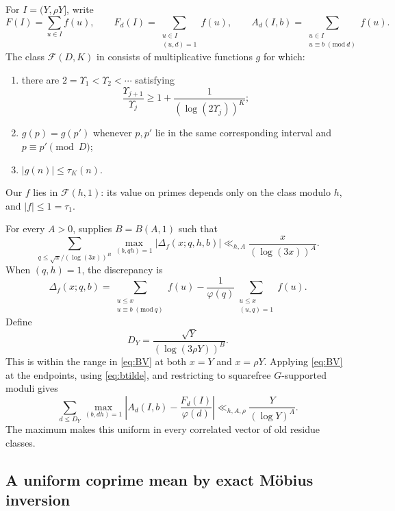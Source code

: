 \documentclass[10pt]{amsart}
\numberwithin{equation}{section}
\theoremstyle{remark}
\begin{document}
For \(I=(Y,\rho Y]\), write
\[
 F(I)=\sum_{u\in I}f(u),
 \qquad
 F_d(I)=\sum_{\substack{u\in I\\(u,d)=1}}f(u),
 \qquad
 A_d(I,b)=\sum_{\substack{u\in I\\u\equiv b\;(\mathrm{mod}\ d)}}f(u).
\]
The class \(\mathcal F(D,K)\) in \cite[Definition 1.1]{FouvryTenenbaum}
consists of multiplicative functions \(g\) for which:
\begin{enumerate}[label=\textup{(\roman*)}]
\item there are \(2=\Upsilon_1<\Upsilon_2<\cdots\) satisfying
\[
 \frac{\Upsilon_{j+1}}{\Upsilon_j}
 \ge1+\frac1{(\log(2\Upsilon_j))^K};
\]
\item \(g(p)=g(p')\) whenever \(p,p'\) lie in the same corresponding
interval and \(p\equiv p'\pmod D\);
\item \(\lvert g(n)\rvert\le\tau_K(n)\).
\end{enumerate}
Our \(f\) lies in \(\mathcal F(h,1)\): its value on primes depends only on
the class modulo \(h\), and \(\lvert f\rvert\le1=\tau_1\).

For every \(A>0\), \cite[Theorem 1.8]{FouvryTenenbaum} supplies
\(B=B(A,1)\) such that
\begin{equation}\label{eq:BV}
 \sum_{q\le\sqrt{x}/(\log(3x))^B}
 \max_{(b,qh)=1}\lvert\Delta_f(x;q,h,b)\rvert
 \ll_{h,A}\frac{x}{(\log(3x))^A}.
\end{equation}
When \((q,h)=1\), the discrepancy is
\[
 \Delta_f(x;q,b)
 =
 \sum_{\substack{u\le x\\u\equiv b\;(\mathrm{mod}\ q)}}f(u)
 -\frac1{\varphi(q)}
 \sum_{\substack{u\le x\\(u,q)=1}}f(u).
\]
Define
\begin{equation}\label{eq:DY}
 D_Y=\frac{\sqrt Y}{(\log(3\rho Y))^B}.
\end{equation}
This is within the range in \eqref{eq:BV} at both \(x=Y\) and \(x=\rho Y\).
Applying \eqref{eq:BV} at the endpoints, using \eqref{eq:btilde}, and
restricting to squarefree \(G\)-supported moduli gives
\begin{equation}\label{eq:translated-BV}
 \sum_{d\le D_Y}\max_{(b,dh)=1}
 \left|A_d(I,b)-\frac{F_d(I)}{\varphi(d)}\right|
 \ll_{h,A,\rho}\frac Y{(\log Y)^A}.
\end{equation}
The maximum makes this uniform in every correlated vector of old residue
classes.

\subsection{A uniform coprime mean by exact M\"obius inversion}
\end{document}

